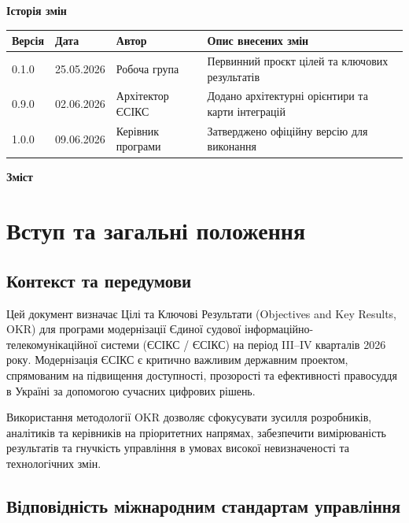 \documentclass{article}
\begin{document}
\vspace{20pt}
\begin{center}
  {\large\color{nato}\bfseries Історія змін\par}
\end{center}
\vspace{10pt}
\begin{longtable}{@{}p{1.5cm}p{2.0cm}p{3.0cm}p{7.0cm}@{}}
\toprule
\textbf{Версія} & \textbf{Дата} & \textbf{Автор} & \textbf{Опис внесених змін} \\
\midrule
0.1.0 & 25.05.2026 & Робоча група & Первинний проєкт цілей та ключових результатів \\
0.9.0 & 02.06.2026 & Архітектор ЄСІКС & Додано архітектурні орієнтири та карти інтеграцій \\
1.0.0 & 09.06.2026 & Керівник програми & Затверджено офіційну версію для виконання \\
\bottomrule
\end{longtable}

\newpage
\begin{center}
  {\Huge\color{nato}\bfseries Зміст\par}
\end{center}
\vspace{40pt}
\tableofcontents

\newpage

\section{Вступ та загальні положення}

\subsection{Контекст та передумови}
Цей документ визначає Цілі та Ключові Результати (Objectives and Key Results, OKR) для програми модернізації Єдиної судової інформаційно-телекомунікаційної системи (ЄСІКС / ЄСІКС) на період III--IV кварталів 2026 року. Модернізація ЄСІКС є критично важливим державним проектом, спрямованим на підвищення доступності, прозорості та ефективності правосуддя в Україні за допомогою сучасних цифрових рішень.

Використання методології OKR дозволяє сфокусувати зусилля розробників, аналітиків та керівників на пріоритетних напрямах, забезпечити вимірюваність результатів та гнучкість управління в умовах високої невизначеності та технологічних змін.

\subsection{Відповідність міжнародним стандартам управління}
\end{document}
